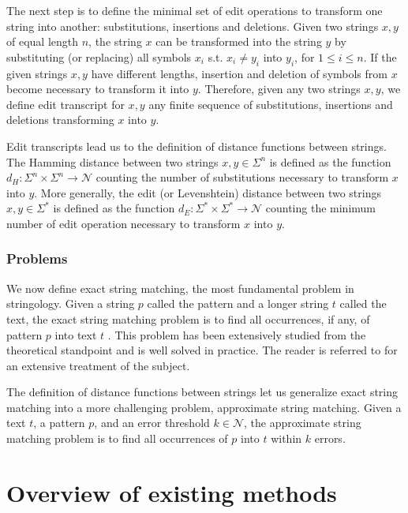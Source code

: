 The next step is to define the minimal set of edit operations to transform one string into another: substitutions, insertions and deletions.
Given two strings $x,y$ of equal length $n$, the string $x$ can be transformed into the string $y$ by substituting (or replacing) all symbols $x_i$ s.t. $x_i \neq y_i$ into $y_i$, for $1 \leq i \leq n$.
If the given strings $x,y$ have different lengths, insertion and deletion of symbols from $x$ become necessary to transform it into $y$.
Therefore, given any two strings $x,y$, we define edit transcript for $x,y$ any finite sequence of substitutions, insertions and deletions transforming $x$ into $y$.

Edit transcripts lead us to the definition of distance functions between strings.
The Hamming distance between two strings $x,y \in \Sigma^{n}$ is defined as the function $d_H : \Sigma^{n} \times \Sigma^{n} \rightarrow \mathcal{N}$ counting the number of substitutions necessary to transform $x$ into $y$.
More generally, the edit (or Levenshtein) distance between two strings $x,y \in \Sigma^{*}$ is defined as the function $d_E : \Sigma^{*} \times \Sigma^{*} \rightarrow \mathcal{N}$ counting the minimum number of edit operation necessary to transform $x$ into $y$.

\subsubsection{Problems}

We now define exact string matching, the most fundamental problem in stringology.
Given a string $p$ called the pattern and a longer string $t$ called the text, the exact string matching problem is to find all occurrences, if any, of pattern $p$ into text $t$ \cite{Gusfield1997}.
This problem has been extensively studied from the theoretical standpoint and is well solved in practice. The reader is referred to \cite{?} for an extensive treatment of the subject.

The definition of distance functions between strings let us generalize exact string matching into a more challenging problem, approximate string matching.
Given a text $t$, a pattern $p$, and an error threshold $k \in \mathcal{N}$, the approximate string matching problem is to find all occurrences of $p$ into $t$ within $k$ errors.


\section{Overview of existing methods}

